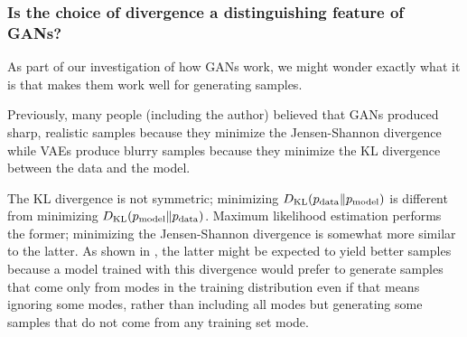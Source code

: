  

  \subsubsection{Is the choice of divergence a distinguishing feature of GANs?}

  As part of our investigation of how GANs work, we might wonder exactly what it is
  that makes them work well for generating samples.

  Previously, many people (including the author) believed that GANs produced sharp,
  realistic samples because they minimize the Jensen-Shannon divergence while
  VAEs produce blurry samples because they minimize the KL divergence between the
  data and the model.

  The KL divergence is not symmetric; minimizing $D_{\mathrm{KL}}(p_{\rm{data}} \Vert p_{\rm{model}})$
  is different from minimizing $D_{\mathrm{KL}}(p_{\rm{model}} \Vert p_{\rm{data}})$.
  Maximum likelihood estimation performs the former; minimizing the Jensen-Shannon
  divergence is somewhat more similar to the latter.
  As shown in , the latter might be expected to yield better samples
  because a model trained with this divergence would prefer
  to generate samples that come only from modes in the training distribution
  even if that means ignoring some modes, rather than
  including all modes but generating some samples that do not come 
  from any training set mode.

